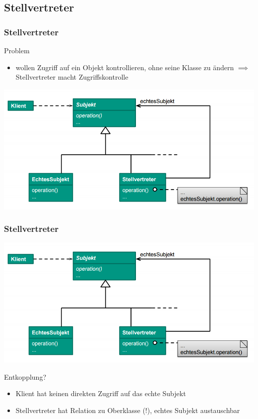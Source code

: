 \documentclass[18pt]{beamer}
\begin{document}
	\subsection{Stellvertreter}
	\begin{frame}
		\frametitle{Stellvertreter}
		\begin{block}{Problem}
			\begin{itemize}
				\item wollen Zugriff auf ein Objekt kontrollieren, ohne seine Klasse zu ändern \linebreak \pause $\implies$ Stellvertreter macht Zugriffskontrolle
			\end{itemize}
		\end{block}
		\pause
		\centering
		\includegraphics[scale=0.4]{./pics/tut3/prox.png}
	\end{frame}

	\begin{frame}
		\frametitle{Stellvertreter}
		\centering
		\includegraphics[scale=0.4]{./pics/tut3/prox.png}
		\begin{block}{Entkopplung?}
			\begin{itemize}
				\pause 
				\item Klient hat keinen direkten Zugriff auf das echte Subjekt
				\pause 
				\item Stellvertreter hat Relation zu Oberklasse (!), echtes Subjekt austauschbar
			\end{itemize}
		\end{block}
	\end{frame}
\end{document}
